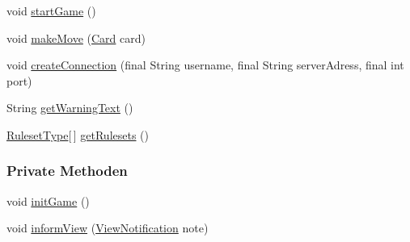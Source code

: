 \begin{DoxyCompactItemize}
\item 
void \hyperlink{a00003_ab1f321a2f17fa8ba0f5ab4e2621fd6d6}{start\-Game} ()
\item 
void \hyperlink{a00003_a41b6350a6a34cbcfd019774bec169e19}{make\-Move} (\hyperlink{a00054}{Card} card)
\item 
void \hyperlink{a00003_ab253c4c00d973c915dca29188fec7482}{create\-Connection} (final String username, final String server\-Adress, final int port)
\item 
String \hyperlink{a00003_aedbb05fd7520d0e0f5866447187b0536}{get\-Warning\-Text} ()
\item 
\hyperlink{a00066}{Ruleset\-Type}\mbox{[}$\,$\mbox{]} \hyperlink{a00003_a4ac4cd11b7f4bab99e8973f2a89cc5a1}{get\-Rulesets} ()
\end{DoxyCompactItemize}
\subsubsection*{Private Methoden}
\begin{DoxyCompactItemize}
\item 
void \hyperlink{a00003_a486f7b71aa892de0f05c6187647613b9}{init\-Game} ()
\item 
void \hyperlink{a00003_a5f8e8b8e5973f9334c73bdecd8244818}{inform\-View} (\hyperlink{a00024}{View\-Notification} note)
\end{DoxyCompactItemize}
